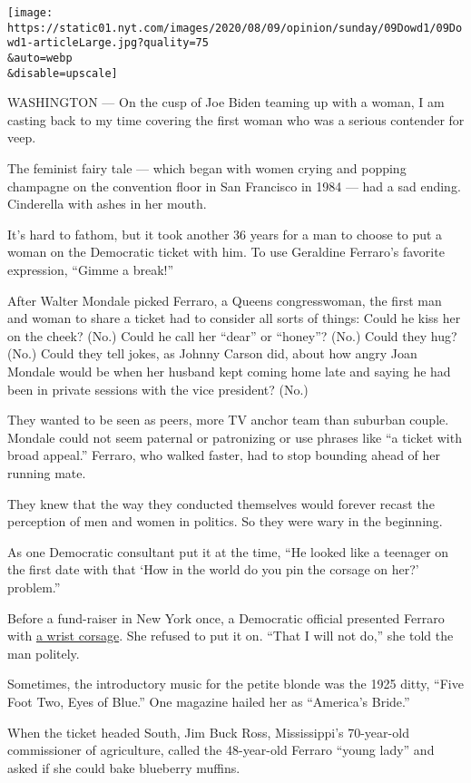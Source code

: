 \texttt{[image: https://static01.nyt.com/images/2020/08/09/opinion/sunday/09Dowd1/09Dowd1-articleLarge.jpg?quality=75\\\&auto=webp\\\&disable=upscale]}

WASHINGTON --- On the cusp of Joe Biden teaming up with a woman, I am
casting back to my time covering the first woman who was a serious
contender for veep.

The feminist fairy tale --- which began with women crying and popping
champagne on the convention floor in San Francisco in 1984 --- had a sad
ending. Cinderella with ashes in her mouth.

It's hard to fathom, but it took another 36 years for a man to choose to
put a woman on the Democratic ticket with him. To use Geraldine
Ferraro's favorite expression, ``Gimme a break!''

After Walter Mondale picked Ferraro, a Queens congresswoman, the first
man and woman to share a ticket had to consider all sorts of things:
Could he kiss her on the cheek? (No.) Could he call her ``dear'' or
``honey''? (No.) Could they hug? (No.) Could they tell jokes, as Johnny
Carson did, about how angry Joan Mondale would be when her husband kept
coming home late and saying he had been in private sessions with the
vice president? (No.)

They wanted to be seen as peers, more TV anchor team than suburban
couple. Mondale could not seem paternal or patronizing or use phrases
like ``a ticket with broad appeal.'' Ferraro, who walked faster, had to
stop bounding ahead of her running mate.

They knew that the way they conducted themselves would forever recast
the perception of men and women in politics. So they were wary in the
beginning.

As one Democratic consultant put it at the time, ``He looked like a
teenager on the first date with that `How in the world do you pin the
corsage on her?' problem.''

Before a fund-raiser in New York once, a Democratic official presented
Ferraro with
\href{https://www.nytimes.com/1984/10/10/us/ferraro-campaign-perspectives-that-startle.html}{a
wrist corsage}. She refused to put it on. ``That I will not do,'' she
told the man politely.

Sometimes, the introductory music for the petite blonde was the 1925
ditty, ``Five Foot Two, Eyes of Blue.'' One magazine hailed her as
``America's Bride.''

When the ticket headed South, Jim Buck Ross, Mississippi's 70-year-old
commissioner of agriculture, called the 48-year-old Ferraro ``young
lady'' and asked if she could bake blueberry muffins.


